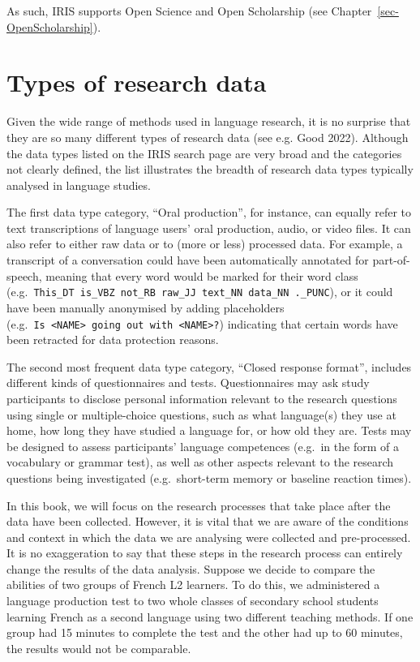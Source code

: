 \documentclass[
  letterpaper,
  DIV=11,
  numbers=noendperiod]{scrreprt}
\begin{document}
As such, IRIS supports Open Science and Open Scholarship (see
Chapter~\ref{sec-OpenScholarship}).

\section{Types of research data}\label{sec-ResearchData}

Given the wide range of methods used in language research, it is no
surprise that they are so many different types of research data (see
e.g. Good 2022). Although the data types listed on the IRIS search page
are very broad and the categories not clearly defined, the list
illustrates the breadth of research data types typically analysed in
language studies.

The first data type category, ``Oral production'', for instance, can
equally refer to text transcriptions of language users' oral production,
audio, or video files. It can also refer to either raw data or to (more
or less) processed data. For example, a transcript of a conversation
could have been automatically annotated for part-of-speech, meaning that
every word would be marked for their word class
(e.g.~\texttt{This\_DT\ is\_VBZ\ not\_RB\ raw\_JJ\ text\_NN\ data\_NN\ .\_PUNC}),
or it could have been manually anonymised by adding placeholders
(e.g.~\texttt{Is\ \textless{}NAME\textgreater{}\ going\ out\ with\ \textless{}NAME\textgreater{}?})
indicating that certain words have been retracted for data protection
reasons.

The second most frequent data type category, ``Closed response format'',
includes different kinds of questionnaires and tests. Questionnaires may
ask study participants to disclose personal information relevant to the
research questions using single or multiple-choice questions, such as
what language(s) they use at home, how long they have studied a language
for, or how old they are. Tests may be designed to assess participants'
language competences (e.g.~in the form of a vocabulary or grammar test),
as well as other aspects relevant to the research questions being
investigated (e.g.~short-term memory or baseline reaction times).

In this book, we will focus on the research processes that take place
after the data have been collected. However, it is vital that we are
aware of the conditions and context in which the data we are analysing
were collected and pre-processed. It is no exaggeration to say that
these steps in the research process can entirely change the results of
the data analysis. Suppose we decide to compare the abilities of two
groups of French L2 learners. To do this, we administered a language
production test to two whole classes of secondary school students
learning French as a second language using two different teaching
methods. If one group had 15 minutes to complete the test and the other
had up to 60 minutes, the results would not be comparable.
\end{document}
